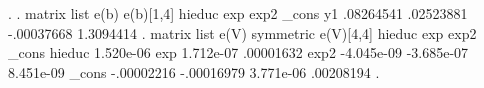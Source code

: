 . 
. matrix list e(b)
{\smallskip}
e(b)[1,4]
        hieduc         exp        exp2       _cons
y1   .08264541   .02523881  -.00037668   1.3094414
{\smallskip}
. matrix list e(V)
{\smallskip}
symmetric e(V)[4,4]
            hieduc         exp        exp2       _cons
hieduc   1.520e-06
   exp   1.712e-07   .00001632
  exp2  -4.045e-09  -3.685e-07   8.451e-09
 _cons  -.00002216  -.00016979   3.771e-06   .00208194
{\smallskip}
. 
